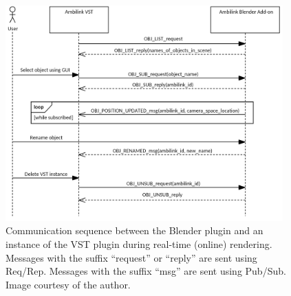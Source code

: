 \begin{figure}
    \centering
    \includegraphics[width=0.95\textwidth]{images/implementation/basic_comm_sequence.png}
    \caption{Communication sequence between the Blender plugin and an instance of the VST plugin during real-time (online) rendering.
             Messages with the suffix ``request'' or ``reply'' are sent using Req/Rep.
             Messages with the suffix ``msg'' are sent using Pub/Sub.
             Image courtesy of the author. \label{fig:basic_comm_sequence}}
\end{figure}

